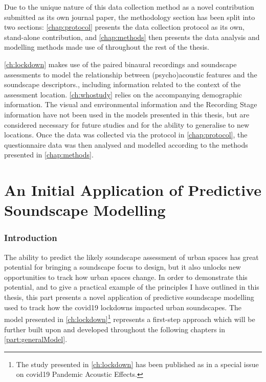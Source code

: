 \documentclass[twoside,fontsize=12pt,titlepage,chapterprefix=true
]{scrbook}
\begin{document}
Due to the unique nature of this data collection method as a novel contribution submitted as its own journal paper, the methodology section has been split into two sections: \cref{chap:protocol} presents the data collection protocol as its own, stand-alone contribution, and \cref{chap:methods} then presents the data analysis and modelling methods made use of throughout the rest of the thesis. 

\cref{ch:lockdown} makes use of the paired binaural recordings and soundscape assessments to model the relationship between (psycho)acoustic features and the soundscape descriptors., including information related to the context of the assessment location. \cref{ch:whostudy} relies on the accompanying demographic information. The visual and environmental information and the Recording Stage information have not been used in the models presented in this thesis, but are considered necessary for future studies and for the ability to generalise to new locations. Once the data was collected via the protocol in \cref{chap:protocol}, the questionnaire data was then analysed and modelled according to the methods presented in \cref{chap:methods}.





\part{An Initial Application of Predictive Soundscape Modelling}
\label{part:Lockdown}
\section*{Introduction}

The ability to predict the likely soundscape assessment of urban spaces has great potential for bringing a soundscape focus to design, but it also unlocks new opportunities to track how urban spaces change. In order to demonstrate this potential, and to give a practical example of the principles I have outlined in this thesis, this part presents a novel application of predictive soundscape modelling used to track how the \gls{covid19} lockdowns impacted urban soundscapes. The model presented in \cref{ch:lockdown}\footnote{The study presented in \cref{ch:lockdown} has been published as \citep{Mitchell2021Investigating} in a special issue on \gls{covid19} Pandemic Acoustic Effects. } represents a first-step approach which will be further built upon and developed throughout the following chapters in \cref{part:generalModel}.
\end{document}
